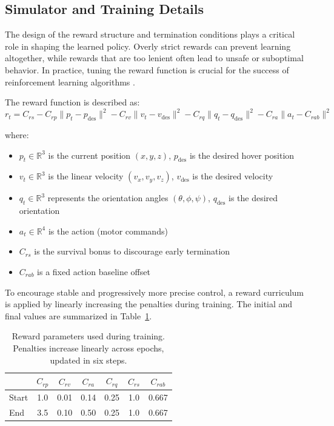 \subsection{Simulator and Training Details} \label{sup:sim}

The design of the reward structure and termination conditions plays a critical role in shaping the learned policy. Overly strict rewards can prevent learning altogether, while rewards that are too lenient often lead to unsafe or suboptimal behavior. In practice, tuning the reward function is crucial for the success of reinforcement learning algorithms \cite{Silver2021}.

The reward function is described as:
\begin{equation}\label{eq:supreward}
    r_t = C_{rs} - C_{rp}\|p_t - p_{\text{des}}\|^2 - C_{rv}\|v_t - v_{\text{des}}\|^2 - C_{rq}\|q_t - q_{\text{des}}\|^2 - C_{ra}\|a_t- C_{rab}\|^2 
\end{equation}

where:
\begin{itemize}
    \item $p_t \in \mathbb{R}^3$ is the current position $(x, y, z)$, $p_{\text{des}}$ is the desired hover position
    \item $v_t \in \mathbb{R}^3$ is the linear velocity $(v_x, v_y, v_z)$, $v_{\text{des}}$ is the desired velocity
    \item $q_t \in \mathbb{R}^3$ represents the orientation angles $(\theta, \phi, \psi)$, $q_{\text{des}}$ is the desired orientation
    \item $a_t \in \mathbb{R}^4$ is the action (motor commands)
    \item $C_{rs}$ is the survival bonus to discourage early termination
    \item $C_{rab}$ is a fixed action baseline offset
\end{itemize}

To encourage stable and progressively more precise control, a reward curriculum is applied by linearly increasing the penalties during training. The initial and final values are summarized in Table~\ref{tab:reward_parameters}.

\begin{table}[h]
    \centering
    \begin{tabular}{@{}lcccccc@{}}
        \toprule
        & \(C_{rp}\) & \(C_{rv}\) & \(C_{ra}\) & \(C_{rq}\) & \(C_{rs}\) & \(C_{rab}\) \\
        \midrule
        Start & 1.0 & 0.01 & 0.14 & 0.25 & 1.0 & 0.667 \\
        End   & 3.5 & 0.10 & 0.50 & 0.25 & 1.0 & 0.667 \\
        \bottomrule
    \end{tabular}
    \caption{Reward parameters used during training. Penalties increase linearly across epochs, updated in six steps.}
    \label{tab:reward_parameters}
\end{table}




